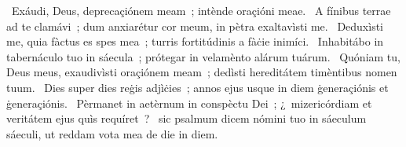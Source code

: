 ~Exáudi, Deus, deprecaçiónem meam~; intènde oraçióni meae. 
~A fínibus terrae ad te clamávi~; dum anxiarétur cor meum, in pètra exaltavìsti me. 
~Deduxìsti me, quia fàctus es spes mea~; turris fortitúdinis a fàċie inimíci. 
~Inhabitábo in tabernáculo tuo in sáecula~; prótegar in velamènto alárum tuárum. 
~Quóniam tu, Deus meus, exaudivìsti oraçiónem meam~; dedìsti hereditátem timèntibus nomen tuum. 
~Dies super dies reġis adjìċies~; annos ejus usque in diem ġeneraçiónis et ġeneraçiónis. 
~Pèrmanet in aetèrnum in conspèctu Dei~; ¿~mizericórdiam et veritátem ejus quìs requíret~? 
~sic psalmum dicem nómini tuo in sáeculum sáeculi, ut reddam vota mea de die in diem. 
